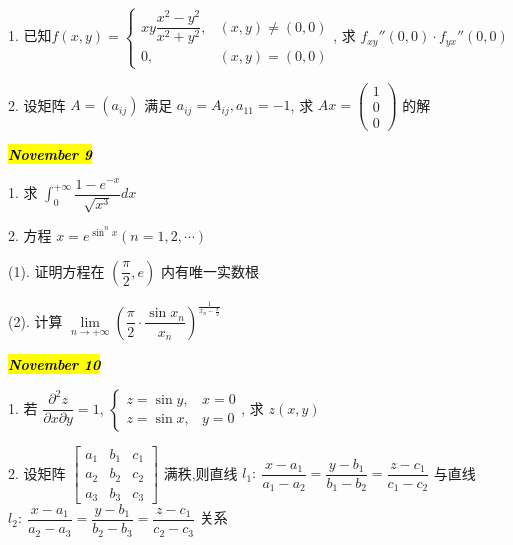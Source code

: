 1. 已知$f(x,y)=
\begin{cases}
	xy\dfrac{x^2-y^2}{x^2+y^2}, &(x,y)\neq(0,0)\\
	0, &(x,y)=(0,0)
\end{cases}$, 求 $f_{xy}''(0,0)\cdot f_{yx}''(0,0)$
\begin{solution}
	
\end{solution}

2. 设矩阵 $A=(a_{ij})$ 满足 $a_{ij}=A_{ij},a_{11}=-1$,
求 $Ax=
\begin{pmatrix}
	1 \\
	0 \\
	0
\end{pmatrix}$ 的解
\begin{solution}
	
\end{solution}

\hl{\textbf{\textit{November 9}}}

1. 求 $\displaystyle{\int_{0}^{+\infty}\dfrac{1-e^{-x}}{\sqrt{x^3}}dx}$
\begin{solution}
	
\end{solution}

2. 方程 $\displaystyle{x=e^{\sin^{n}x}(n=1,2,\cdots)}$

(1). 证明方程在 $(\dfrac{\pi}{2},e)$ 内有唯一实数根

(2). 计算 $\displaystyle{\lim\limits_{n\to +\infty}\left(\dfrac{\pi}{2}\cdot \dfrac{\sin x_{n}}{x_{n}} \right)^{\frac{1}{x_{n}-\frac{\pi}{2}}}}$
\begin{solution}
	
\end{solution}

\hl{\textbf{\textit{November 10}}}

1. 若 $\dfrac{\partial^2 z}{\partial x\partial y}=1$, 
$\begin{cases}
	z = \sin y, &x=0 \\
	z = \sin x, &y=0
\end{cases}$, 求 $z(x,y)$
\begin{solution}
	
\end{solution}

2. 设矩阵
$\begin{bmatrix}
	a_{1} & b_{1} & c_{1} \\
	a_{2} & b_{2} & c_{2} \\
	a_{3} & b_{3} & c_{3}
\end{bmatrix}$ 满秩,则直线
 $l_{1}:\ \dfrac{x-a_{1}}{a_{1}-a_{2}}=\dfrac{y-b_{1}}{b_{1}-b_{2}}=\dfrac{z-c_{1}}{c_{1}-c_{2}}$
 与直线 $l_{2}:\ \dfrac{x-a_{1}}{a_{2}-a_{3}}=\dfrac{y-b_{1}}{b_{2}-b_{3}}=\dfrac{z-c_{1}}{c_{2}-c_{3}}$ 关系
\begin{solution}
	
\end{solution}

